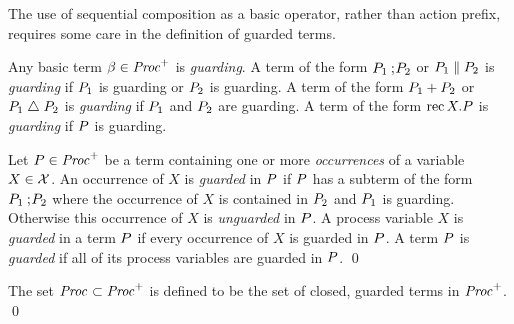 The use of sequential composition as a basic operator, rather than
action prefix, requires some care in the definition of guarded terms.
\begin{definition}
Any basic term $\basic \in \ProcO{}$ is \emph{guarding}. A term
of the form $\P_1 \sq \P_2$ or $\P_1 \parallel \P_2$ is \emph{guarding}
if $\P_1$ is guarding or $\P_2$ is guarding. A term of the form 
$\P_1 \choice \P_2$ or $\P_1 \interrupt \P_2$ is \emph{guarding} if
$\P_1$ and $\P_2$ are guarding. A term of the form $\rec X.\P$ is
\emph{guarding} if $\P$ is guarding.

Let $\P \in \ProcO{}$ be a term containing one or more \emph{occurrences}
of a variable $X \in \XX$.
An occurrence of $X$ is \emph{guarded} in $\P$ if $\P$ has a subterm of
the form $\P_1 \sq \P_2$ where the occurrence of $X$ is contained in
$\P_2$ and $\P_1$ is guarding. Otherwise this occurrence
of $X$ is \emph{unguarded} in $\P$. A process variable $X$ is \emph{guarded}
in a term $\P$ if every occurrence of $X$ is guarded in $\P$. A term $\P$
is \emph{guarded} if all of its process variables are guarded in $\P$.
\qed
\end{definition}

\begin{definition}
The set $\Proc{} \subset \ProcO{}$ is defined to be the set of 
closed, guarded terms in $\ProcO{}$.
\qed
\end{definition}

